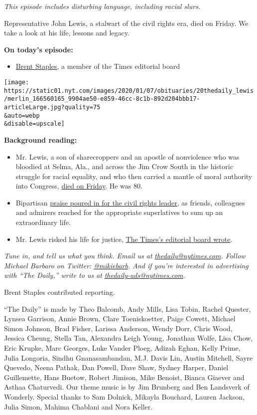 \emph{This episode includes disturbing language, including racial
slurs.}

Representative John Lewis, a stalwart of the civil rights era, died on
Friday. We take a look at his life, lessons and legacy.

\textbf{On today's episode:}

\begin{itemize}
\tightlist
\item
  \href{https://www.nytimes.com/by/brent-staples}{Brent Staples}, a
  member of the Times editorial board
\end{itemize}

\texttt{[image: https://static01.nyt.com/images/2020/01/07/obituaries/20thedaily\_lewis/merlin\_166560165\_9904ae50-e859-46cc-8c1b-892d204bbb17-articleLarge.jpg?quality=75\\\&auto=webp\\\&disable=upscale]}

\textbf{Background reading:}

\begin{itemize}
\item
  Mr. Lewis, a son of sharecroppers and an apostle of nonviolence who
  was bloodied at Selma, Ala., and across the Jim Crow South in the
  historic struggle for racial equality, and who then carried a mantle
  of moral authority into Congress,
  \href{https://www.nytimes.com/2020/07/17/us/john-lewis-dead.html}{died
  on Friday}. He was 80.
\item
  Bipartisan
  \href{https://www.nytimes.com/2020/07/18/us/politics/john-lewis-dies-reaction.html}{praise
  poured in for the civil rights leader}, as friends, colleagues and
  admirers reached for the appropriate superlatives to sum up an
  extraordinary life.
\item
  Mr. Lewis risked his life for justice,
  \href{https://www.nytimes.com/2020/07/17/opinion/john-lewis.html}{The
  Times's editorial board wrote}.
\end{itemize}

\emph{Tune in, and tell us what you think. Email us at}
\href{mailto:thedaily@nytimes.com}{\emph{thedaily@nytimes.com}}\emph{.
Follow Michael Barbaro on Twitter:}
\href{https://twitter.com/mikiebarb}{\emph{@mikiebarb}}\emph{. And if
you're interested in advertising with ``The Daily,'' write to us at}
\href{mailto:thedaily-ads@nytimes.com}{\emph{thedaily-ads@nytimes.com}}\emph{.}

Brent Staples contributed reporting.

``The Daily'' is made by Theo Balcomb, Andy Mills, Lisa Tobin, Rachel
Quester, Lynsea Garrison, Annie Brown, Clare Toeniskoetter, Paige
Cowett, Michael Simon Johnson, Brad Fisher, Larissa Anderson, Wendy
Dorr, Chris Wood, Jessica Cheung, Stella Tan, Alexandra Leigh Young,
Jonathan Wolfe, Lisa Chow, Eric Krupke, Marc Georges, Luke Vander Ploeg,
Adizah Eghan, Kelly Prime, Julia Longoria, Sindhu Gnanasambandan, M.J.
Davis Lin, Austin Mitchell, Sayre Quevedo, Neena Pathak, Dan Powell,
Dave Shaw, Sydney Harper, Daniel Guillemette, Hans Buetow, Robert
Jimison, Mike Benoist, Bianca Giaever and Asthaa Chaturvedi. Our theme
music is by Jim Brunberg and Ben Landsverk of Wonderly. Special thanks
to Sam Dolnick, Mikayla Bouchard, Lauren Jackson, Julia Simon, Mahima
Chablani and Nora Keller.

